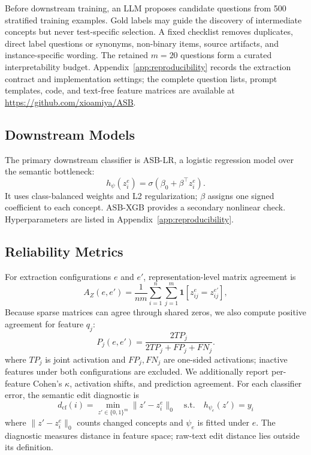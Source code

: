 \documentclass[runningheads]{llncs}
\begin{document}
Before downstream training, an LLM proposes candidate questions from 500 stratified training examples. Gold labels may guide the discovery of intermediate concepts but never test-specific selection. A fixed checklist removes duplicates, direct label questions or synonyms, non-binary items, source artifacts, and instance-specific wording. The retained $m=20$ questions form a curated interpretability budget. Appendix~\ref{app:reproducibility} records the extraction contract and implementation settings; the complete question lists, prompt templates, code, and text-free feature matrices are available at \url{https://github.com/xioamiya/ASB}.

\subsection{Downstream Models}
\label{sec:downstream-models}

The primary downstream classifier is ASB-LR, a logistic regression model over the semantic bottleneck:
\[
    h_\psi(z_i^e)=\sigma(\beta_0+\beta^\top z_i^e).
\]
It uses class-balanced weights and L2 regularization; $\beta$ assigns one signed coefficient to each concept. ASB-XGB provides a secondary nonlinear check. Hyperparameters are listed in Appendix~\ref{app:reproducibility}.

\subsection{Reliability Metrics}
\label{sec:reliability-metrics}

For extraction configurations $e$ and $e'$, representation-level matrix agreement is
\[
    A_Z(e,e') =
    \frac{1}{nm}
    \sum_{i=1}^{n}
    \sum_{j=1}^{m}
    \mathbf{1}[z_{ij}^{e}=z_{ij}^{e'}],
\]
Because sparse matrices can agree through shared zeros, we also compute positive agreement for feature $q_j$:
\[
    P_j(e,e') =
    \frac{2TP_j}{2TP_j + FP_j + FN_j}.
\]
where $TP_j$ is joint activation and $FP_j,FN_j$ are one-sided activations; inactive features under both configurations are excluded. We additionally report per-feature Cohen's $\kappa$, activation shifts, and prediction agreement. For each classifier error, the semantic edit diagnostic is
\[
    d_{\mathrm{cf}}(i) =
    \min_{z' \in \{0,1\}^{m}}
    \|z'-z_i^e\|_0
    \quad
    \mathrm{s.t.}\quad
    h_{\psi_e}(z') = y_i
\]
where $\|z'-z_i^e\|_0$ counts changed concepts and $\psi_e$ is fitted under $e$. The diagnostic measures distance in feature space; raw-text edit distance lies outside its definition.
\end{document}
